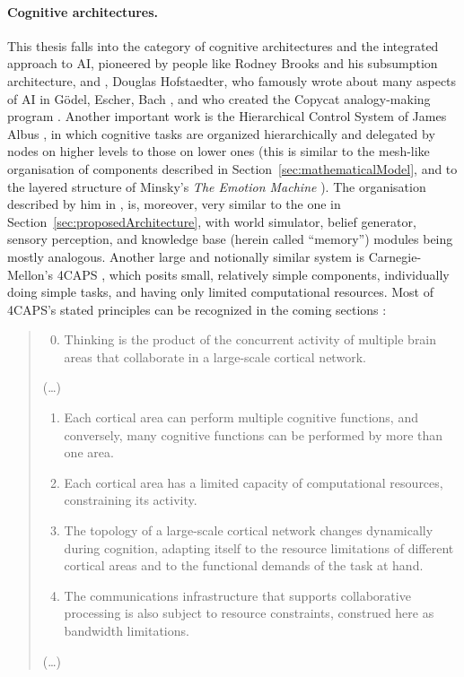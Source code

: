 \paragraph{Cognitive architectures.} This thesis falls into the category of cognitive architectures and the integrated approach to AI, pioneered by people like Rodney Brooks and his subsumption architecture, and \cite{brooksSubsumption}, Douglas Hofstaedter, who famously wrote about many aspects of AI in Gödel, Escher, Bach \cite{geb}, and who created the Copycat analogy-making program \cite{copycat}. Another important work is the Hierarchical Control System of James Albus \cite{albusHCS}, in which cognitive tasks are organized hierarchically and delegated by nodes on higher levels to those on lower ones (this is similar to the mesh-like organisation of components described in Section~\ref{sec:mathematicalModel}, and to the layered structure of Minsky's {\em The Emotion Machine} \cite{emotionMachine}). The organisation described by him in \cite{albus93areference}, is, moreover, very similar to the one in Section~\ref{sec:proposedArchitecture}, with world simulator, belief generator, sensory perception, and knowledge base (herein called ``memory'') modules being mostly analogous. Another large and notionally similar system is Carnegie-Mellon's 4CAPS \cite{4caps}, which posits small, relatively simple components, individually doing simple tasks, and having only limited computational resources. Most of 4CAPS's stated principles can be recognized in the coming sections \cite[Operating Principles of 4CAPS ]{4caps}:
\begin{quote}
	\begin{enumerate}
		\setcounter{enumi}{-1}
		\item Thinking is the product of the concurrent activity of multiple brain areas that collaborate in a large-scale cortical network.
	\end{enumerate}
	
	(\dots)
	
	\begin{enumerate}
		\item Each cortical area can perform multiple cognitive functions, and conversely, many cognitive functions can be performed by more than one area.
		\item Each cortical area has a limited capacity of computational resources, constraining its activity.
		\item The topology of a large-scale cortical network changes dynamically during cognition, adapting itself to the resource limitations of different cortical areas and to the functional demands of the task at hand.
		\item The communications infrastructure that supports collaborative processing is also subject to resource constraints, construed here as bandwidth limitations.
	\end{enumerate}
	
	(\dots)
\end{quote}

